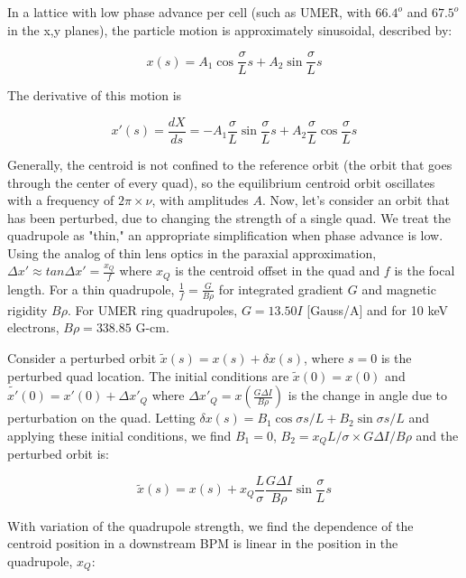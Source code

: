 In a lattice with low phase advance per cell (such as UMER, with $66.4 ^o$ and $67.5 ^o$ in the x,y planes), the particle motion is approximately sinusoidal, described by: 

\begin{equation} x(s) = A_1\cos{\frac{\sigma}{L}s} + A_2\sin{\frac{\sigma}{L}s}\end{equation}

The derivative of this motion is

\begin{equation} x'(s) = \frac{dX}{ds} = -A_1\frac{\sigma}{L}\sin{\frac{\sigma}{L}s} + A_2\frac{\sigma}{L}\cos{\frac{\sigma}{L}s}\end{equation}

Generally, the centroid is not confined to the reference orbit (the orbit that goes through the center of every quad), so the equilibrium centroid orbit oscillates with a frequency of $2\pi \times \nu$, with amplitudes $A$. Now, let's consider an orbit that has been perturbed, due to changing the strength of a single quad. We treat the quadrupole as "thin," an appropriate simplification when phase advance is low. Using the analog of thin lens optics in the paraxial approximation, $\Delta x' \approx tan \Delta x' = \frac{x_Q}{f}$ where $x_Q$ is the centroid offset in the quad and $f$ is the focal length. For a thin quadrupole, $\frac{1}{f} = \frac{G}{B\rho}$ for integrated gradient $G$ and magnetic rigidity $B\rho$. For UMER ring quadrupoles, $G=13.50I$ [Gauss/A] and for 10 keV electrons, $B\rho = 338.85$ G-cm. 

Consider a perturbed orbit $\tilde{x}(s) = x(s) + \delta x(s)$, where $s=0$ is the perturbed quad location. The initial conditions are $\tilde{x}(0) = x(0)$ and $\tilde{x'}(0) = x'(0) + \Delta x'_Q$ where $\Delta x'_Q = x(\frac{G \Delta I}{B\rho})$ is the change in angle due to perturbation on the quad. Letting $\delta x(s) = B_1\cos{\sigma s / L} + B_2\sin{\sigma s / L}$ and applying these initial conditions, we find $B_1 = 0$, $B_2 = x_Q L/\sigma \times G \Delta I / B\rho$ and the perturbed orbit is:

\begin{equation} \tilde{x}(s) = x(s) + x_Q \frac{L}{\sigma} \frac{G \Delta I}{B\rho} \sin{\frac{\sigma}{L}s} \end{equation}

With variation of the quadrupole strength, we find the dependence of the centroid position in a downstream BPM is linear in the position in the quadrupole, $x_Q$: 

